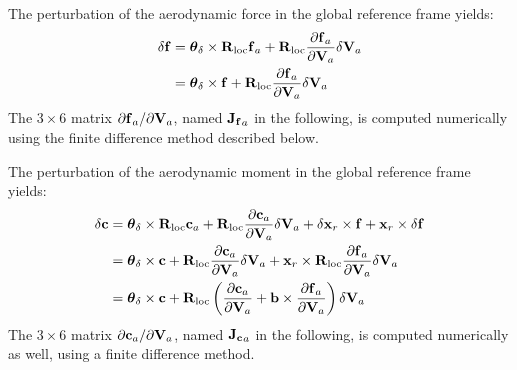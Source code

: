 The perturbation of the aerodynamic force in the global reference frame
yields:
\begin{align}
	\delta\bm{\mathbf{f}}
	& = \bm{\mathbf{\theta}}_{\delta}\times\bm{\mathbf{R}}_{\text{loc}}\bm{\mathbf{f}}_a
	+ \bm{\mathbf{R}}_{\text{loc}}\frac{\partial\bm{\mathbf{f}}_a}{\partial\bm{\mathbf{V}}_a}
		\delta\bm{\mathbf{V}}_a
	\nonumber \\
	&= \bm{\mathbf{\theta}}_{\delta}\times \bm{\mathbf{f}}
	+ \bm{\mathbf{R}}_{\text{loc}}\frac{\partial\bm{\mathbf{f}}_a}{\partial\bm{\mathbf{V}}_a}
		\delta\bm{\mathbf{V}}_a
\end{align}
The $3\times6$ matrix $\partial\bm{\mathbf{f}}_a/\partial\bm{\mathbf{V}}_a$, 
named $\bm{\mathbf{J_f}}_a$ in the
following, is computed numerically using the finite difference method
described below.

The perturbation of the aerodynamic moment in the global reference frame
yields:
\begin{align}
	\delta\bm{\mathbf{c}}
	&= \bm{\mathbf{\theta}}_{\delta}\times\bm{\mathbf{R}}_{\text{loc}}\bm{\mathbf{c}}_a
	+ \bm{\mathbf{R}}_{\text{loc}}\frac{\partial\bm{\mathbf{c}}_a}{\partial\bm{\mathbf{V}}_a}
		\delta\bm{\mathbf{V}}_a
	+ \delta\bm{\mathbf{x}}_r\times\bm{\mathbf{f}}
	+ \bm{\mathbf{x}}_r\times\delta\bm{\mathbf{f}}
	\nonumber \\
	&= \bm{\mathbf{\theta}}_{\delta}\times\bm{\mathbf{c}}
	+ \bm{\mathbf{R}}_{\text{loc}}\frac{\partial\bm{\mathbf{c}}_a}{\partial\bm{\mathbf{V}}_a}
		\delta\bm{\mathbf{V}}_a
	+ \bm{\mathbf{x}}_r\times
		\bm{\mathbf{R}}_{\text{loc}}\frac{\partial\bm{\mathbf{f}}_a}{\partial\bm{\mathbf{V}}_a}
		\delta\bm{\mathbf{V}}_a
	\nonumber \\
	&= \bm{\mathbf{\theta}}_{\delta}\times\bm{\mathbf{c}}
	+ \bm{\mathbf{R}}_{\text{loc}}\left( 
		\frac{\partial\bm{\mathbf{c}}_a}{\partial\bm{\mathbf{V}}_a}
		+ \bm{\mathbf{b}}\times\frac{\partial\bm{\mathbf{f}}_a}{\partial\bm{\mathbf{V}}_a}
	 \right) \delta\bm{\mathbf{V}}_a
\end{align}
The $3\times6$ matrix $\partial\bm{\mathbf{c}}_a/\partial\bm{\mathbf{V}}_a$, 
named $\bm{\mathbf{J_c}}_a$ in the
following, is computed numerically as well, using a finite difference method.

